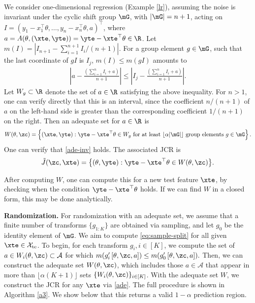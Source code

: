 \documentclass[english]{article}
\begin{document}
\begin{example}
    We consider one-dimensional regression (Example \ref{lr}),
    assuming the noise is invariant under the cyclic shift group $\mG$, 
    with $|\mG|=n+1$, acting on $I = (y_1-x_1^\top\theta,\ldots,y_n-x_n^\top\theta,a)^\top$, where  $a =
    A(\theta,(\xte,\yte)) = \yte - \xte^\top\theta \in \R$.
        Let $m(I) = \left|I_{n+1} - \sum_{i=1}^{n+1} I_i/(n+1)\right|$. 
    For a group element $g \in \mG$, 
    such that the last coordinate of $gI$ is $I_j$,
    $m(I) \leq m(gI)$
    amounts to
    \begin{align*}
     \left|a- \frac{(\sum_{i=1}^{n} I_i + a)}{n+1}\right| \leq \left|I_j- \frac{(\sum_{i=1}^{n} I_i + a)}{n+1}\right|.
\end{align*}
Let $W_g \subset \R$ 
denote the set of $a\in \R$ satisfying the above inequality. 
For $n>1$, one can verify directly that this is an interval, 
since the coefficient $n/(n+1)$ of $a$ on the left-hand side is greater than the corresponding coefficient $1/(n+1)$ on the right. 
Then an adequate set for $a \in \R$ is
$$
W(\theta,\zc) = \left\{ (\xte,\yte) : \yte - \xte^\top\theta \in W_g \textnormal{ for at least } \lfloor \alpha|\mG|\rfloor \textnormal{ group elements } g \in \mG \right\}.
$$
One can verify that \eqref{ade-inv} holds.
The associated JCR is
    \begin{align*}
        \tilde J(\zc,\xte) = \big\{(\theta,\yte): \yte - \xte^\top\theta \in W(\theta, \zc)\big\}.
    \end{align*}
\end{example}   
After computing $W$, 
one can compute this for a new test feature $\xte$, by checking when the condition $\yte - \xte^\top\theta$ holds.
If we can find $W$ in a closed form, this may be done analytically.


{\bf Randomization.} 
For randomization with an adequate set,
we assume that a finite number of transforms $\{g_{1:K}\}$ are obtained via sampling, 
and let $g_0$ be the identity element of $\mG$. %
We aim to compute \eqref{eq:sample-split}
for all given $\xte \in \mathcal{X}_{\mathrm{te}}$.
To begin, for each transform $g_i, i \in [K]$, we compute the 
set of 
$a \in W_i(\theta, \zc) \subset \mathcal{A}$ for which
$m(g_i'\left[\theta, \zc, a \right]) \leq m(g_0'\left[\theta, \zc, a \right]).$
Then, we can construct the adequate set $W(\theta, \zc)$, which includes those $a \in \mathcal{A}$ that appear in more than $\lfloor{\alpha (K+1)}\rfloor$ sets $\{W_i(\theta, \zc)\}_{i\in[K]}$.
With the adequate set $W$, we construct the JCR for any $\xte$ via \eqref{ade}.
     The full procedure
    is shown in Algorithm \ref{a3}.
We show below that this returns a valid $1-\alpha$ prediction region.
\end{document}
